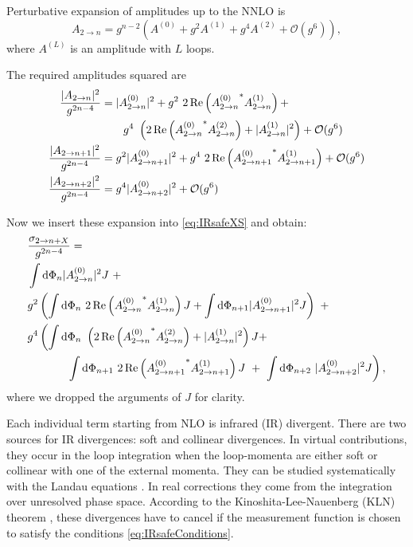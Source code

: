 Perturbative expansion of amplitudes up to the NNLO is
\begin{equation}
  \label{eq:amplitudes_expansion}
  A_{2\to n} = g^{n-2} \left( A^{(0)} + g^2 A^{(1)} + g^4 A^{(2)} + \mathcal{O}(g^{6}) \right),
\end{equation}
where $A^{(L)}$ is an amplitude with $L$ loops.

The required amplitudes squared are
\begin{subequations}
  \begin{align}
    \frac{\vert A_{2\to n} \vert^2}{g^{2n-4}}  &= \vert A^{(0)}_{2\to n} \vert^2 + g^2~2\Re\left({A^{(0)}_{2\to n}}^{*} A^{(1)}_{2\to n}\right) + \\ & \qquad g^4~\left(2\Re\left({A^{(0)}_{2\to n}}^{*} A^{(2)}_{2\to n}\right) + \vert A^{(1)}_{2\to n} \vert^2 \right)+ \mathcal{O}(g^{6})  \\
    \frac{\vert A_{2\to n+1} \vert^2}{g^{2n-4}} &= g^2 \vert A^{(0)}_{2\to n+1} \vert^2 + g^4~2\Re\left({A^{(0)}_{2\to n+1}}^{*} A^{(1)}_{2\to n+1}\right) + \mathcal{O}(g^{6}) \\
    \frac{\vert A_{2\to n+2} \vert^2}{g^{2n-4}} &= g^4 \vert A^{(0)}_{2\to n+2} \vert^2 + \mathcal{O}(g^{6})
  \end{align}
\end{subequations}

Now we insert these expansion into \eqref{eq:IRsafeXS} and obtain:
\begin{subequations}
  \label{eq:NNLO_xs}
  \begin{align}
    \nonumber
    & \frac{\sigma_{2\rightarrow n + X}}{g^{2n-4}} = \\
    & \int \dd\Phi_n \vert A^{(0)}_{2\to n} \vert^2 J  ~+ \\
    & g^{2} \left( \int \dd\Phi_n~2\Re\left({A^{(0)}_{2\to n}}^{*} A^{(1)}_{2\to n}\right) J  + \int \dd\Phi_{n+1} \vert A^{(0)}_{2\to n+1} \vert^2 J \right) ~+ \\
    & g^{4} \left( \int \dd\Phi_n~ \left( 2\Re\left({A^{(0)}_{2\to n}}^{*} A^{(2)}_{2\to n}\right) + \vert A^{(1)}_{2\to n} \vert^2 \right) J   + \right. \\ 
    \label{eq:RR}
    & \hspace{8ex} \left. \int \dd\Phi_{n+1}~ 2\Re\left({A^{(0)}_{2\to n+1}}^{*} A^{(1)}_{2\to n+1}\right) J ~+~ \int \dd\Phi_{n+2}~ \vert A^{(0)}_{2\to n+2} \vert^2 J \right),
  \end{align}
\end{subequations}
where we dropped the arguments of $J$ for clarity. 

Each individual term starting from NLO is infrared (IR) divergent.
There are two sources for IR divergences: soft and collinear divergences.
In virtual contributions, they occur in the loop integration when the loop-momenta are
either soft or collinear with one of the external momenta.
They can be studied systematically with the Landau equations \cite{Landau1959}.
In real corrections they come from the integration over unresolved phase space.
According to the Kinoshita-Lee-Nauenberg (KLN) theorem \cite{Kinoshita1962,Lee1964},
these divergences have to cancel if the measurement function is chosen to satisfy the conditions \eqref{eq:IRsafeConditions}.

